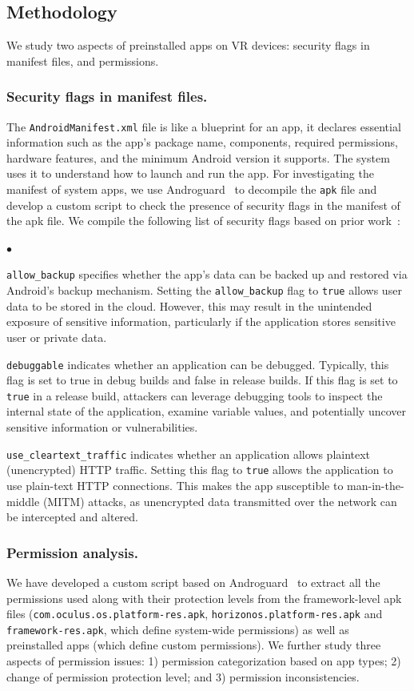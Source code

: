 \documentclass[sigconf]{acmart}
\newcommand{\cc}[1]{\mbox{\smaller[0.5]\texttt{#1}}}
\newenvironment{packeditemize}{
\begin{list}{$\bullet$}{
\setlength{\labelwidth}{6pt}
\setlength{\itemsep}{2pt}
\setlength{\leftmargin}{\labelwidth}
\addtolength{\leftmargin}{\labelsep}
\setlength{\parindent}{1pt}
\setlength{\listparindent}{\parindent}
\setlength{\parsep}{1pt}
\setlength{\topsep}{1pt}}}{\end{list}}
\begin{document}
\subsection{Methodology}

We study two aspects of preinstalled apps on VR devices: security flags in manifest files, and permissions.

\subsubsection{Security flags in manifest files.} 
The \cc{AndroidManifest.xml} file is like a blueprint for an app, it declares essential information such as the app’s package name, components, required permissions, hardware features, and the minimum Android version it supports. The system uses it to understand how to launch and run the app.
For investigating the manifest of system apps, we use Androguard~\cite{androguard} to decompile the \cc{apk} file and develop a custom script to check the presence of security flags in the manifest of the apk file.
We compile the following list of security flags based on prior work~\cite{guo2024empirical}:
\begin{packeditemize}
    \item \cc{allow\_backup} specifies whether the app's data can be backed up and restored via Android's backup mechanism. Setting the \cc{allow\_backup}  flag to \cc{true} allows user data to be stored in the cloud. However, this may result in the unintended exposure of sensitive information, particularly if the application stores sensitive user or private data.
    \item \cc{debuggable}  indicates whether an application can be debugged. Typically, this flag is set to true in debug builds and false in release builds. If this flag is set to \cc{true} in a release build, attackers can leverage debugging tools to inspect the internal state of the application, examine variable values, and potentially uncover sensitive information or vulnerabilities.
    \item \cc{use\_cleartext\_traffic} indicates whether an application allows plaintext (unencrypted) HTTP traffic. Setting this flag to \cc{true} allows the application to use plain-text HTTP connections. This makes the app susceptible to man-in-the-middle (MITM) attacks, as unencrypted data transmitted over the network can be intercepted and altered.\end{packeditemize}

\subsubsection{Permission analysis.}
We have developed a custom script based on Androguard~\cite{androguard} to extract all the permissions used along with their protection levels from the framework-level apk files (\cc{com.oculus.os.platform-res.apk}, \cc{horizonos.platform-res.apk} and \cc{framework-res.apk}, which define system-wide permissions) as well as preinstalled apps (which define custom permissions).
We further study three aspects of permission issues:
1) permission categorization based on app types;
2) change of permission protection level; and
3) permission inconsistencies.
\end{document}
